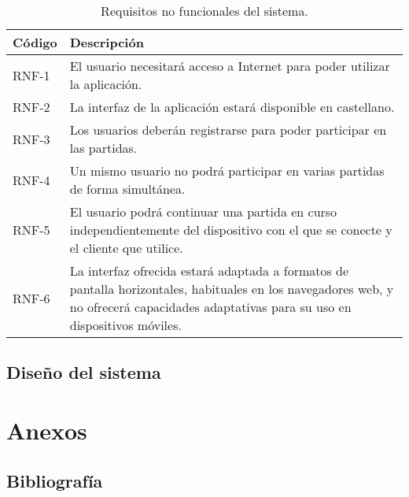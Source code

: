 \documentclass[11pt, a4paper, titlepage]{article}
\begin{document}
\begin{table}[hbt]
    \centering
    \begin{tabularx}{\textwidth}{|l|X|}
         \hline
         Código & Descripción \\
         \hline
         RNF-1 & El usuario necesitará acceso a Internet para poder utilizar la aplicación.\\
         RNF-2 & La interfaz de la aplicación estará disponible en castellano.\\
         RNF-3 & Los usuarios deberán registrarse para poder participar en las partidas.\\
         RNF-4 & Un mismo usuario no podrá participar en varias partidas de forma simultánea. \\
         RNF-5 & El usuario podrá continuar una partida en curso independientemente del dispositivo con el que se conecte y el cliente que utilice.\\
         RNF-6 & La interfaz ofrecida estará adaptada a formatos de pantalla horizontales, habituales en los navegadores web, y no ofrecerá capacidades adaptativas para su uso en dispositivos móviles.\\
         \hline
    \end{tabularx}
    \caption{Requisitos no funcionales del sistema.}
    \label{tab:rnf}
\end{table}
\subsection{Diseño del sistema}




\clearpage
\section{Anexos}
\subsection{Bibliografía}

\printbibliography
\end{document}
